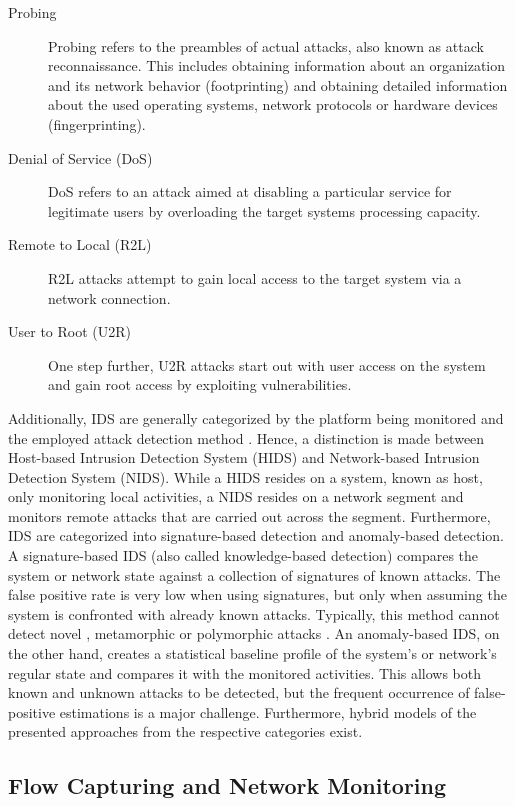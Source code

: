 \begin{description}
    \item[Probing] Probing refers to the preambles of actual attacks, also known as attack reconnaissance. This includes obtaining information about an organization and its network behavior (footprinting) and obtaining detailed information about the used operating systems, network protocols or hardware devices (fingerprinting).
    \item[Denial of Service (DoS)] DoS refers to an attack aimed at disabling a particular service for legitimate users by overloading the target systems processing capacity.
    \item[Remote to Local (R2L)] R2L attacks attempt to gain local access to the target system via a network connection.
    \item[User to Root (U2R)] One step further, U2R attacks start out with user access on the system and gain root access by exploiting vulnerabilities.
\end{description}

Additionally, IDS are generally categorized by the platform being monitored and the employed attack detection method \cite{milenkoski2015evaluating}. Hence, a distinction is made between Host-based Intrusion Detection System (HIDS) and Network-based Intrusion Detection System (NIDS). While a HIDS resides on a system, known as host, only monitoring local activities, a NIDS resides on a network segment and monitors remote attacks that are carried out across the segment. Furthermore, IDS are categorized into signature-based detection and anomaly-based detection. A signature-based IDS (also called knowledge-based detection) compares the system or network state against a collection of signatures of known attacks. The false positive rate is very low when using signatures, but only when assuming the system is confronted with already known attacks. Typically, this method cannot detect novel \cite[403]{whitman_principles_2018}, metamorphic or polymorphic attacks \cite[236]{szor2005art}. An anomaly-based IDS, on the other hand, creates a statistical baseline profile of the system’s or network’s regular state and compares it with the monitored activities. This allows both known and unknown attacks to be detected, but the frequent occurrence of false-positive estimations is a major challenge. Furthermore, hybrid models of the presented approaches from the respective categories exist.

\subsection{Flow Capturing and Network Monitoring}

